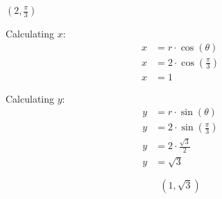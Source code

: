 \begin{problem}[18.]
    $\left( 2, \frac{\pi}{3} \right)$    
\end{problem}

\begin{solution}
    Calculating $x$:
    \begin{align}
        x &= r \cdot \cos(\theta) \\
        x &= 2 \cdot \cos \left( \frac{\pi}{3} \right) \\
        x &= 1
    \end{align}
    
    Calculating $y$:
    \begin{align}
        y &= r \cdot \sin(\theta) \\
        y &= 2 \cdot \sin \left( \frac{\pi}{3} \right) \\
        y &= 2 \cdot \frac{\sqrt{3}}{2} \\
        y &= \sqrt{3}
    \end{align}
    
    \[\boxed{ (1, \sqrt{3}) }\]
\end{solution}